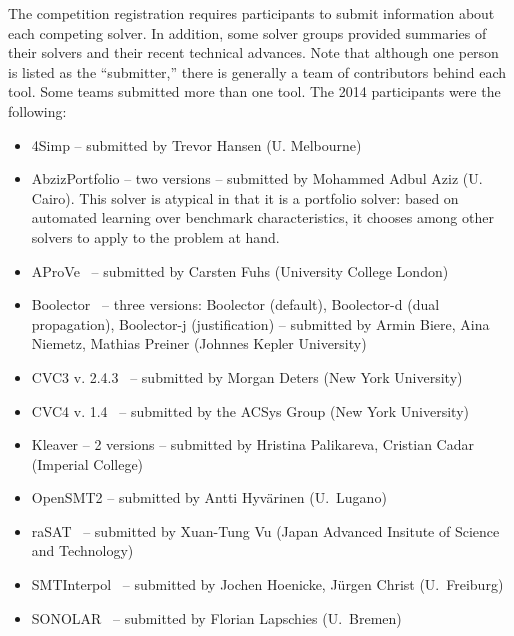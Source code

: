 \documentclass[twoside,11pt]{article}
\begin{document}
The competition registration requires participants to submit information about each competing solver. In addition, some solver groups provided summaries of their solvers and their recent technical advances.
 Note that although one person is listed as the ``submitter,'' there is generally a team of contributors behind each tool. Some teams submitted more than one tool. The 2014 participants were the following:
\begin{itemize}
\item 4Simp -- submitted by Trevor Hansen (U. Melbourne)\\[-15pt]
\item AbzizPortfolio -- two versions -- submitted by Mohammed Adbul Aziz (U. Cairo). This solver is atypical in that it is a portfolio solver: based on automated learning over benchmark characteristics, it chooses among other solvers to apply to the problem at hand.\\[-15pt]
\item AProVe~\cite{AProVE2014} -- submitted by Carsten Fuhs (University College London)\\[-15pt]
\item Boolector~\cite{Boolector2015} -- three versions: Boolector (default),  Boolector-d (dual propagation), Boolector-j (justification) -- submitted by Armin Biere, Aina Niemetz, Mathias Preiner (Johnnes Kepler University)\\[-15pt]
\item CVC3 v. 2.4.3~\cite{BT07} -- submitted by Morgan Deters (New York University)\\[-15pt]
\item CVC4 v. 1.4~\cite{BCD+11} -- submitted by the ACSys Group (New York University)\\[-15pt]
\item Kleaver -- 2 versions -- submitted by Hristina Palikareva, Cristian Cadar (Imperial College)\\[-15pt]
\item OpenSMT2 -- submitted by Antti Hyv\"arinen (U.~Lugano)\\[-15pt]
\item raSAT~\cite{DBLP:conf/smt/KhanhVO14} -- submitted by Xuan-Tung Vu (Japan Advanced Insitute of Science and Technology)\\[-15pt]
\item SMTInterpol~\cite{DBLP:conf/spin/ChristHN12,DBLP:conf/spin/2012} -- submitted by Jochen Hoenicke, J\"urgen Christ (U.~Freiburg)\\[-15pt]
\item SONOLAR~\cite{Peleska:2011:ATC:1986308.1986333} -- submitted by Florian Lapschies (U.~Bremen)\\[-15pt]

\end{itemize}
\end{document}
